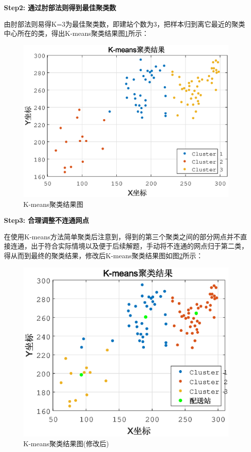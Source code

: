 \documentclass[withoutpreface,bwprint]{cumcmthesis} %
\begin{document}
\textbf{Step2: 通过肘部法则得到最佳聚类数}

由肘部法则易得K=3为最佳聚类数，即建站个数为3，把样本归到离它最近的聚类中心所在的类，得出K-means聚类结果图\ref{K-means聚类结果图}所示：
	
	\begin{figure}[htbp]
		\centering
		\includegraphics[width=13cm]{kmeans.eps}
		\caption{K-means聚类结果图}
		\label{K-means聚类结果图}
	\end{figure}
	
	\textbf{Step3: 合理调整不连通网点}
	
在使用K-means方法简单聚类后注意到，得到的第三个聚类之间的部分网点并不直接连通，出于符合实际情境以及便于后续解题，手动将不连通的网点归于第二类，得从而到最终的聚类结果，修改后K-means聚类结果图如图\ref{fig:K-means聚类结果图（修改后）}所示：
	
	\begin{figure}[htbp]
		\centering
		\includegraphics[width=13cm]{kmeans_re.eps}
		\caption{K-means聚类结果图(修改后)}
		\label{fig:K-means聚类结果图（修改后）}
	\end{figure}
	
\end{document}
